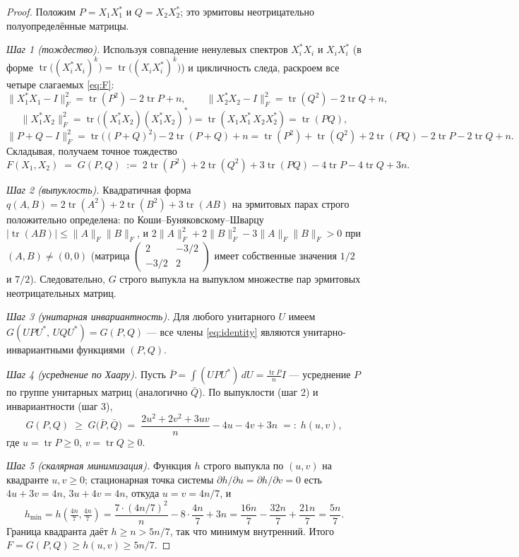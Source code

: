 \documentclass[11pt,a4paper]{article}
\theoremstyle{plain}
\theoremstyle{definition}
\theoremstyle{remark}
\begin{document}
\begin{proof}
Положим $P=X_1X_1^*$ и $Q=X_2X_2^*$; это эрмитовы неотрицательно
полуопределённые матрицы.

\emph{Шаг 1 (тождество).} Используя совпадение ненулевых спектров
$X_i^*X_i$ и $X_iX_i^*$ (в форме
$\operatorname{tr}\bigl((X_i^*X_i)^k\bigr)=\operatorname{tr}\bigl((X_iX_i^*)^k\bigr)$)
и цикличность следа, раскроем все четыре слагаемых \eqref{eq:F}:
\[
\|X_1^*X_1-I\|_F^2=\operatorname{tr}(P^2)-2\operatorname{tr}P+n,
\qquad
\|X_2^*X_2-I\|_F^2=\operatorname{tr}(Q^2)-2\operatorname{tr}Q+n,
\]
\[
\|X_1^*X_2\|_F^2=\operatorname{tr}\bigl((X_1^*X_2)(X_1^*X_2)^*\bigr)
=\operatorname{tr}(X_1X_1^*\,X_2X_2^*)=\operatorname{tr}(PQ),
\]
\[
\|P+Q-I\|_F^2=\operatorname{tr}\bigl((P+Q)^2\bigr)-2\operatorname{tr}(P+Q)+n
=\operatorname{tr}(P^2)+\operatorname{tr}(Q^2)+2\operatorname{tr}(PQ)
-2\operatorname{tr}P-2\operatorname{tr}Q+n.
\]
Складывая, получаем точное тождество
\begin{equation}
F(X_1,X_2)\;=\;G(P,Q)\;:=\;
2\operatorname{tr}(P^2)+2\operatorname{tr}(Q^2)+3\operatorname{tr}(PQ)
-4\operatorname{tr}P-4\operatorname{tr}Q+3n.
\label{eq:identity}
\end{equation}

\emph{Шаг 2 (выпуклость).} Квадратичная форма
$q(A,B)=2\operatorname{tr}(A^2)+2\operatorname{tr}(B^2)+3\operatorname{tr}(AB)$
на эрмитовых парах строго положительно определена: по
Коши--Буняковскому--Шварцу $|\operatorname{tr}(AB)|\le\|A\|_F\|B\|_F$, и
$2\|A\|_F^2+2\|B\|_F^2-3\|A\|_F\|B\|_F>0$ при $(A,B)\ne(0,0)$ (матрица
$\left(\begin{smallmatrix}2&-3/2\\-3/2&2\end{smallmatrix}\right)$ имеет
собственные значения $1/2$ и $7/2$). Следовательно, $G$ строго выпукла
на выпуклом множестве пар эрмитовых неотрицательных матриц.

\emph{Шаг 3 (унитарная инвариантность).} Для любого унитарного $U$
имеем $G(UPU^*,\,UQU^*)=G(P,Q)$ — все члены \eqref{eq:identity} являются
унитарно-инвариантными функциями $(P,Q)$.

\emph{Шаг 4 (усреднение по Хаару).} Пусть $\bar P=\int (UPU^*)\,dU
=\frac{\operatorname{tr}P}{n}I$ — усреднение $P$ по группе унитарных
матриц (аналогично $\bar Q$). По выпуклости (шаг 2) и инвариантности
(шаг 3),
\[
G(P,Q)\;\ge\;G\bigl(\bar P,\bar Q\bigr)
\;=\;\frac{2u^2+2v^2+3uv}{n}-4u-4v+3n
\;=:\;h(u,v),
\]
где $u=\operatorname{tr}P\ge 0$, $v=\operatorname{tr}Q\ge 0$.

\emph{Шаг 5 (скалярная минимизация).} Функция $h$ строго выпукла по
$(u,v)$ на квадранте $u,v\ge 0$; стационарная точка системы
$\partial h/\partial u=\partial h/\partial v=0$ есть $4u+3v=4n$,
$3u+4v=4n$, откуда $u=v=4n/7$, и
\[
h_{\min}=h\!\left(\tfrac{4n}{7},\tfrac{4n}{7}\right)
=\frac{7\cdot(4n/7)^2}{n}-8\cdot\frac{4n}{7}+3n
=\frac{16n}{7}-\frac{32n}{7}+\frac{21n}{7}=\frac{5n}{7}.
\]
Граница квадранта даёт $h\ge n>5n/7$, так что минимум внутренний. Итого
$F=G(P,Q)\ge h(u,v)\ge 5n/7$.


\end{proof}
\end{document}
